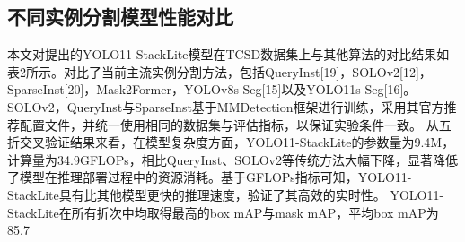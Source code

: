 \subsection{不同实例分割模型性能对比}{}
本文对提出的YOLO11-StackLite模型在TCSD数据集上与其他算法的对比结果如表2所示。对比了当前主流实例分割方法，包括QueryInst[19]，SOLOv2[12]，SparseInst[20]，Mask2Former，YOLOv8s-Seg[15]以及YOLO11s-Seg[16]。SOLOv2，QueryInst与SparseInst基于MMDetection框架进行训练，采用其官方推荐配置文件，并统一使用相同的数据集与评估指标，以保证实验条件一致。
从五折交叉验证结果来看，在模型复杂度方面，YOLO11-StackLite的参数量为9.4M，计算量为34.9GFLOPs，相比QueryInst、SOLOv2等传统方法大幅下降，显著降低了模型在推理部署过程中的资源消耗。基于GFLOPs指标可知，YOLO11-StackLite具有比其他模型更快的推理速度，验证了其高效的实时性。
YOLO11-StackLite在所有折次中均取得最高的box mAP与mask mAP，平均box mAP为85.7%
